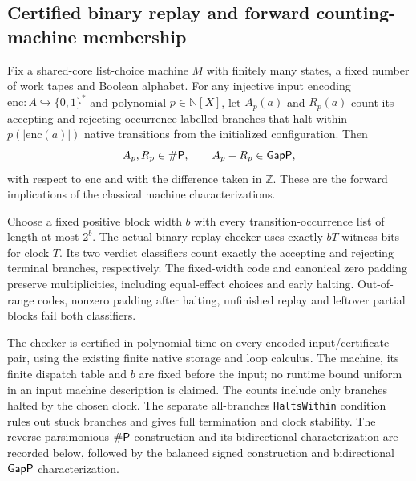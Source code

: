 \begin{result}
\subsection{Certified binary replay and forward counting-machine membership}
Fix a shared-core list-choice machine $M$ with finitely many states, a fixed
number of work tapes and Boolean alphabet. For any injective input encoding
$\mathrm{enc}:A\hookrightarrow\{0,1\}^*$ and polynomial $p\in\mathbb N[X]$, let
$A_p(a)$ and $R_p(a)$ count its accepting and rejecting occurrence-labelled
branches that halt within $p(|\mathrm{enc}(a)|)$ native transitions from the
initialized configuration. Then
\[
 A_p,R_p\in\#\mathsf{P},\qquad A_p-R_p\in\mathsf{GapP},
\]
with respect to $\mathrm{enc}$ and with the difference taken in $\mathbb Z$.
These are the forward implications of the classical machine
characterizations.\citep{Valiant1979,FennerFortnowKurtz1994}

Choose a fixed positive block width $b$ with every transition-occurrence list
of length at most $2^b$. The actual binary replay checker uses exactly $bT$
witness bits for clock $T$. Its two verdict classifiers count exactly the
accepting and rejecting terminal branches, respectively. The fixed-width code
and canonical zero padding preserve multiplicities, including equal-effect
choices and early halting. Out-of-range codes, nonzero padding after halting,
unfinished replay and leftover partial blocks fail both classifiers.

The checker is certified in polynomial time on every encoded input/certificate
pair, using the existing finite native storage and loop calculus. The machine,
its finite dispatch table and $b$ are fixed before the input; no runtime bound
uniform in an input machine description is claimed. The counts include only
branches halted by the chosen clock. The separate all-branches
\texttt{HaltsWithin} condition rules out stuck branches and gives full
termination and clock stability. The reverse parsimonious $\#\mathsf{P}$ construction
and its bidirectional characterization are recorded below, followed by the
balanced signed construction and bidirectional $\mathsf{GapP}$ characterization.
\end{result}

